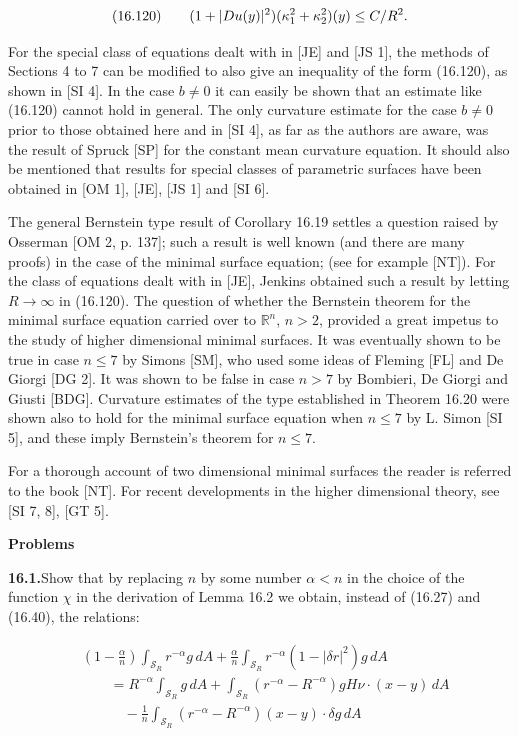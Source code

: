 \begin{equation}
(16.120)\qquad (1+|Du(y)|^2)(\kappa_1^2+\kappa_2^2)(y)\leq C/R^2.
\end{equation}




For the special class of equations dealt with in [JE] and [JS 1], the methods of
Sections 4 to 7 can be modified to also give an inequality of the form (16.120), as
shown in [SI 4]. In the case $b\neq 0$ it can easily be shown that an estimate like
(16.120) cannot hold in general. The only curvature estimate for the case $b\neq 0$ prior
to those obtained here and in [SI 4], as far as the authors are aware, was the result
of Spruck [SP] for the constant mean curvature equation. It should also be
mentioned that results for special classes of parametric surfaces have been obtained
in [OM 1], [JE], [JS 1] and [SI 6].

The general Bernstein type result of Corollary 16.19 settles a question raised
by Osserman [OM 2, p. 137]; such a result is well known (and there are many
proofs) in the case of the minimal surface equation; (see for example [NT]). For
the class of equations dealt with in [JE], Jenkins obtained such a result by letting
$R\to\infty$ in (16.120). The question of whether the Bernstein theorem for the
minimal surface equation carried over to $\mathbb{R}^n$, $n>2$, provided a great impetus to the
study of higher dimensional minimal surfaces. It was eventually shown to be true
in case $n\le 7$ by Simons [SM], who used some ideas of Fleming [FL] and De Giorgi
[DG 2]. It was shown to be false in case $n>7$ by Bombieri, De Giorgi and Giusti
[BDG]. Curvature estimates of the type established in Theorem 16.20 were shown
also to hold for the minimal surface equation when $n\le 7$ by L. Simon [SI 5], and
these imply Bernstein's theorem for $n\le 7$.

For a thorough account of two dimensional minimal surfaces the reader is
referred to the book [NT]. For recent developments in the higher dimensional
theory, see [SI 7, 8], [GT 5].

\bigskip
\noindent\textbf{Problems}

\medskip
\noindent\textbf{16.1.}\quad Show that by replacing $n$ by some number $\alpha<n$ in the choice of the function
$\chi$ in the derivation of Lemma 16.2 we obtain, instead of (16.27) and (16.40),
the relations:

\begin{align*}
&\left(1-\frac{\alpha}{n}\right)\int_{\mathcal S_R} r^{-\alpha} g\, dA+\frac{\alpha}{n}\int_{\mathcal S_R} r^{-\alpha}(1-|\delta r|^2)g\, dA\tag{16.121}\\
&\qquad = R^{-\alpha}\int_{\mathcal S_R} g\, dA+\int_{\mathcal S_R}(r^{-\alpha}-R^{-\alpha})gH\nu\cdot (x-y)\, dA\\
&\qquad\quad -\frac{1}{n}\int_{\mathcal S_R}(r^{-\alpha}-R^{-\alpha})(x-y)\cdot \delta g\, dA
\end{align*}

